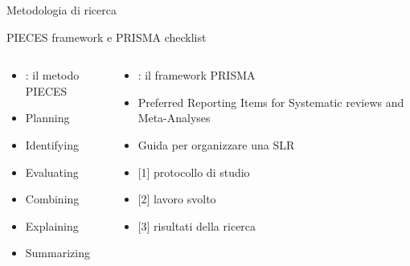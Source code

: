 \documentclass{beamer}
\begin{document}
\begin{frame}
{\centerline{Metodologia di ricerca}}
{\centering PIECES framework e PRISMA checklist}

  \begin{columns}
        \begin{column}{0.5\textwidth}
            \begin{itemize}
                \item \citet{pieces}: il metodo PIECES
                \item Planning
                \item \hspace*{1em} Identifying
                \item \hspace*{2em} Evaluating
                \item \hspace*{3em} Combining
                \item \hspace*{4em} Explaining
                \item \hspace*{5em} Summarizing
            \end{itemize}
        \end{column}
        \begin{column}{0.5\textwidth}
            \raggedleft
            \begin{itemize}
                \item \citet{prisma}: il framework PRISMA
                \item Preferred Reporting Items for Systematic reviews and Meta-Analyses
                \item Guida per organizzare una SLR
                \item \hspace*{1em} [1] protocollo di studio
                \item \hspace*{1em} [2] lavoro svolto 
                \item \hspace*{1em} [3] risultati della ricerca
            \end{itemize}
        \end{column}
    \end{columns}

    
\end{frame}
\end{document}
